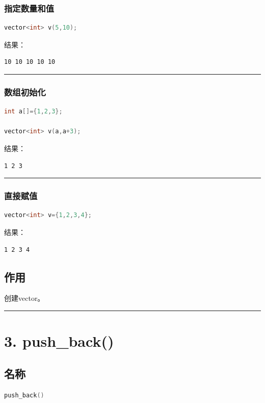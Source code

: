 \documentclass[10pt,twocolumn]{extarticle}
\begin{document}
\subsubsection{指定数量和值}
\begin{lstlisting}[language=C++]
vector<int> v(5,10);
\end{lstlisting}
结果：
\begin{lstlisting}
10 10 10 10 10
\end{lstlisting}

\noindent\rule{\linewidth}{0.4pt}

\subsubsection{数组初始化}
\begin{lstlisting}[language=C++]
int a[]={1,2,3};

vector<int> v(a,a+3);
\end{lstlisting}
结果：
\begin{lstlisting}
1 2 3
\end{lstlisting}

\noindent\rule{\linewidth}{0.4pt}

\subsubsection{直接赋值}
\begin{lstlisting}[language=C++]
vector<int> v={1,2,3,4};
\end{lstlisting}
结果：
\begin{lstlisting}
1 2 3 4
\end{lstlisting}

\subsection{作用}
创建vector。

\noindent\rule{\linewidth}{0.4pt}

\section{3. push\_back()}

\subsection{名称}
\begin{lstlisting}[language=C++]
push_back()
\end{lstlisting}
\end{document}
